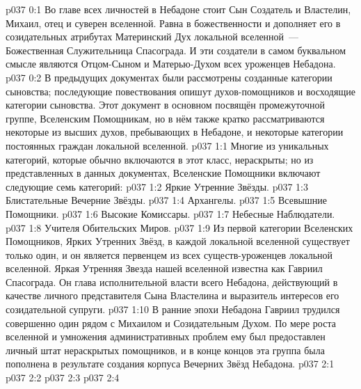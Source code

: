 \author{Блистательная Вечерняя Звезда}
\vs p037 0:1 Во главе всех личностей в Небадоне стоит Сын Создатель и Властелин, Михаил, отец и суверен вселенной. Равна в божественности и дополняет его в созидательных атрибутах Материнский Дух локальной вселенной~--- Божественная Служительница Спасограда. И эти создатели в самом буквальном смысле являются Отцом\hyp{}Сыном и Матерью\hyp{}Духом всех уроженцев Небадона.
\vs p037 0:2 В предыдущих документах были рассмотрены созданные категории сыновства; последующие повествования опишут духов\hyp{}помощников и восходящие категории сыновства. Этот документ в основном посвящён промежуточной группе, Вселенским Помощникам, но в нём также кратко рассматриваются некоторые из высших духов, пребывающих в Небадоне, и некоторые категории постоянных граждан локальной вселенной.
\vs p037 1:1 Многие из уникальных категорий, которые обычно включаются в этот класс, нераскрыты; но из представленных в данных документах, Вселенские Помощники включают следующие семь категорий:
\vs p037 1:2 Яркие Утренние Звёзды.
\vs p037 1:3 Блистательные Вечерние Звёзды.
\vs p037 1:4 Архангелы.
\vs p037 1:5 Всевышние Помощники.
\vs p037 1:6 Высокие Комиссары.
\vs p037 1:7 Небесные Наблюдатели.
\vs p037 1:8 Учителя Обительских Миров.
\vs p037 1:9 \pc Из первой категории Вселенских Помощников, Ярких Утренних Звёзд, в каждой локальной вселенной существует только один, и он является первенцем из всех существ\hyp{}уроженцев локальной вселенной. Яркая Утренняя Звезда нашей вселенной известна как Гавриил Спасограда. Он глава исполнительной власти всего Небадона, действующий в качестве личного представителя Сына Властелина и выразитель интересов его созидательной супруги.
\vs p037 1:10 В ранние эпохи Небадона Гавриил трудился совершенно один рядом с Михаилом и Созидательным Духом. По мере роста вселенной и умножения административных проблем ему был предоставлен личный штат нераскрытых помощников, и в конце концов эта группа была пополнена в результате создания корпуса Вечерних Звёзд Небадона.
\vs p037 2:1 
\vs p037 2:2 
\vs p037 2:3 
\vs p037 2:4 \pc 

